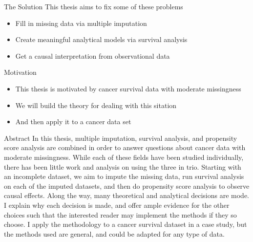 \documentclass{beamer}
\begin{document}
\begin{frame}{The Solution}
This thesis aims to fix some of these problems
  \begin{itemize}
   \item Fill in missing data via multiple imputation
   \item Create meaningful analytical models via survival analysis
   \item Get a causal interpretation from observational data
  \end{itemize}


\end{frame}

\begin{frame}{Motivation}
\begin{itemize}
   \item This thesis is motivated by cancer survival data with moderate missingness
   \item We will build the theory for dealing with this sitation
   \item And then apply it to a cancer data set
  \end{itemize}


\end{frame}

\begin{frame}{Abstract}
In this thesis, multiple imputation, survival analysis, and propensity score analysis are combined in 
order to answer questions about cancer data with moderate missingness. While each of these fields have 
been studied individually, there has been little work and analysis on using the three in trio.
Starting with an incomplete dataset, we aim to impute the missing data, run survival analysis on each
of the imputed datasets, and then do propensity score analysis to observe causal effects.
Along the way, many theoretical and analytical decisions are mode. I explain why each decision is made, 
and offer ample evidence for the other choices such that the interested reader may implement the methods
if they so choose. I apply the methodology to a cancer survival dataset in a case study, but the methods 
used are general, and could be adapted for any type of data.
 
\end{frame}
\end{document}
